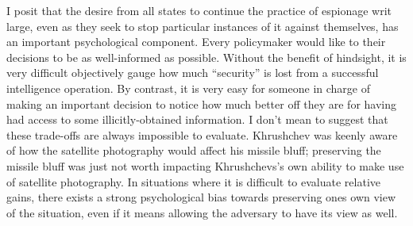 \documentclass{memoir}
\begin{document}
\begin{refsegment}
I posit that the desire from all states to continue the practice of espionage writ large, even as they seek to stop particular instances of it against themselves, has an important psychological component. Every policymaker would like to their decisions to be as well-informed as possible. Without the benefit of hindsight, it is very difficult objectively gauge how much ``security'' is lost from a successful intelligence operation. By contrast, it is very easy for someone in charge of making an important decision to notice how much better off they are for having had access to some illicitly-obtained information. I don't mean to suggest that these trade-offs are always impossible to evaluate. Khrushchev was keenly aware of how the satellite photography would affect his missile bluff; preserving the missile bluff was just not worth impacting Khrushchevs's own ability to make use of satellite photography. In situations where it is difficult to evaluate relative gains, there exists a strong psychological bias towards preserving ones own view of the situation, even if it means allowing the adversary to have its view as well.




\newpage
\printbibliography[heading=subbibliography]

\end{refsegment}
\end{document}
